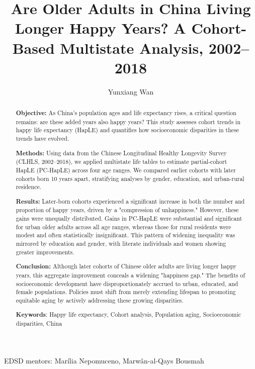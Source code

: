 \documentclass[12pt, a4paper]{article}
\title{\textbf{Are Older Adults in China Living Longer Happy Years? A Cohort-Based Multistate Analysis, 2002–2018}}
\author[]{Yunxiang Wan} %
\date{}
\begin{document}
\newpage

\maketitle

\begin{center}
  {EDSD mentors: Marília Nepomuceno, Marwân-al-Qays Bousmah}
\end{center}
\vspace{1em}

\begin{abstract}
  \noindent\textbf{Objective:} As China’s population ages and life expectancy rises, a critical question remains: are these added years also happy years? This study assesses cohort trends in happy life expectancy (HapLE) and quantifies how socioeconomic disparities in these trends have evolved.

  \noindent\textbf{Methods:} Using data from the Chinese Longitudinal Healthy Longevity Survey (CLHLS, 2002–2018), we applied multistate life tables to estimate partial-cohort HapLE (PC-HapLE) across four age ranges. We compared earlier cohorts with later cohorts born 10 years apart, stratifying analyses by gender, education, and urban-rural residence.

  \noindent\textbf{Results:} Later-born cohorts experienced a significant increase in both the number and proportion of happy years, driven by a "compression of unhappiness." However, these gains were unequally distributed. Gains in PC-HapLE were substantial and significant for urban older adults across all age ranges, whereas those for rural residents were modest and often statistically insignificant. This pattern of widening inequality was mirrored by education and gender, with literate individuals and women showing greater improvements.

  \noindent\textbf{Conclusion:} Although later cohorts of Chinese older adults are living longer happy years, this aggregate improvement conceals a widening "happiness gap." The benefits of socioeconomic development have disproportionately accrued to urban, educated, and female populations. Policies must shift from merely extending lifespan to promoting equitable aging by actively addressing these growing disparities.
  \vspace{1em}

  \noindent\textbf{Keywords}: Happy life expectancy, Cohort analysis, Population aging, Socioeconomic disparities, China
\end{abstract}
\end{document}
